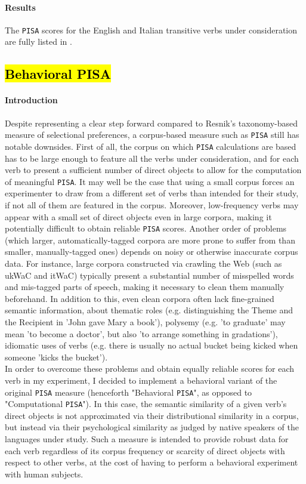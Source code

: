 \paragraph{Results}
The \texttt{PISA} scores for the English and Italian transitive verbs under consideration are fully listed in .\\ %


\subsection{\hl{Behavioral PISA}}

\paragraph{Introduction} 
Despite representing a clear step forward compared to Resnik's taxonomy-based measure of selectional preferences, a corpus-based measure such as \texttt{PISA} still has notable downsides. First of all, the corpus on which \texttt{PISA} calculations are based has to be large enough to feature all the verbs under consideration, and for each verb to present a sufficient number of direct objects to allow for the computation of meaningful \texttt{PISA}. It may well be the case that using a small corpus forces an experimenter to draw from a different set of verbs than intended for their study, if not all of them are featured in the corpus. Moreover, low-frequency verbs may appear with a small set of direct objects even in large corpora, making it potentially difficult to obtain reliable \texttt{PISA} scores. Another order of problems (which larger, automatically-tagged corpora are more prone to suffer from than smaller, manually-tagged ones) depends on noisy or otherwise inaccurate corpus data. For instance, large corpora constructed via crawling the Web (such as ukWaC and itWaC) typically present a substantial number of misspelled words and mis-tagged parts of speech, making it necessary to clean them manually beforehand. In addition to this, even clean corpora often lack fine-grained semantic information, about thematic roles (e.g. distinguishing the Theme and the Recipient in 'John gave Mary a book'), polysemy (e.g. 'to graduate' may mean 'to become a doctor', but also 'to arrange something in gradations'), idiomatic uses of verbs (e.g. there is usually no actual bucket being kicked when someone 'kicks the bucket').\\
In order to overcome these problems and obtain equally reliable scores for each verb in my experiment, I decided to implement a behavioral variant of the original \texttt{PISA} measure (henceforth "Behavioral \texttt{PISA}", as opposed to "Computational \texttt{PISA}"). In this case, the semantic similarity of a given verb's direct objects is not approximated via their distributional similarity in a corpus, but instead via their psychological similarity as judged by native speakers of the languages under study. Such a measure is intended to provide robust data for each verb regardless of its corpus frequency or scarcity of direct objects with respect to other verbs, at the cost of having to perform a behavioral experiment with human subjects.

